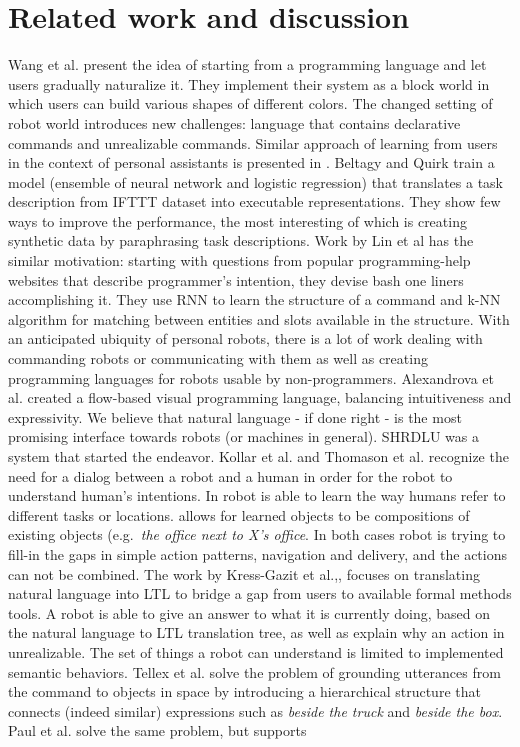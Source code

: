 \section{Related work and discussion}
Wang et al.\cite{wangVoxelurn} present the idea of starting from a programming language and let users gradually naturalize it. They implement their system as a block world in which users can build various shapes of different colors. The changed setting of robot world introduces new challenges: language that contains declarative commands and unrealizable commands. Similar approach of learning from users in the context of personal assistants is presented in \cite{azariaLia}. Beltagy and Quirk\cite{beltagyIFTT} train a model (ensemble of neural network and logistic regression) that translates a task description from IFTTT dataset into executable representations. They show few ways to improve the performance, the most interesting of which is creating synthetic data by paraphrasing task descriptions. Work by Lin et al\cite{linTelina} has the similar motivation: starting with questions from popular programming-help websites that describe programmer's intention, they devise bash one liners accomplishing it. They use RNN to learn the structure of a command and k-NN algorithm for matching between entities and slots available in the structure. With an anticipated ubiquity of personal robots, there is a lot of work dealing with commanding robots or communicating with them as well as creating programming languages for robots usable by non-programmers. Alexandrova et al.\cite{roboFlow} created a flow-based visual programming language, balancing intuitiveness and expressivity. We believe that natural language - if done right - is the most promising interface towards robots (or machines in general). SHRDLU\cite{shrdlu} was a system that started the endeavor.  Kollar et al.\cite{kollarDialog} and Thomason et al.\cite{thomasonDialog} recognize the need for a dialog between a robot and a human in order for the robot to understand human's intentions. In \cite{kollarDialog} robot is able to learn the way humans refer to different tasks or locations. \cite{thomasonDialog} allows for learned objects to be compositions of existing objects (e.g.\  \emph{the office next to X's office}. In both cases robot is trying to fill-in the gaps in simple action patterns, navigation and delivery, and the actions can not be combined. The work by Kress-Gazit et al.\cite{hadasTranslatingStructuredEnglish},\cite{hadasLTLMop},\cite{hadasProvablyCorrectReactiveControlFromNaturalLanguage} focuses on translating natural language into LTL to bridge a gap from users to available formal methods tools. A robot is able to give an answer to what it is currently doing, based on the natural language to LTL translation tree, as well as explain why an action in unrealizable. The set of things a robot can understand is limited to implemented semantic behaviors. Tellex et al.\cite{tellexGrounding} solve the problem of grounding utterances from the command to objects in space by introducing a hierarchical structure that connects (indeed similar) expressions such as \emph{beside the truck} and \emph{beside the box}. Paul et al.\cite{paulGrounding} solve the same problem, but supports 